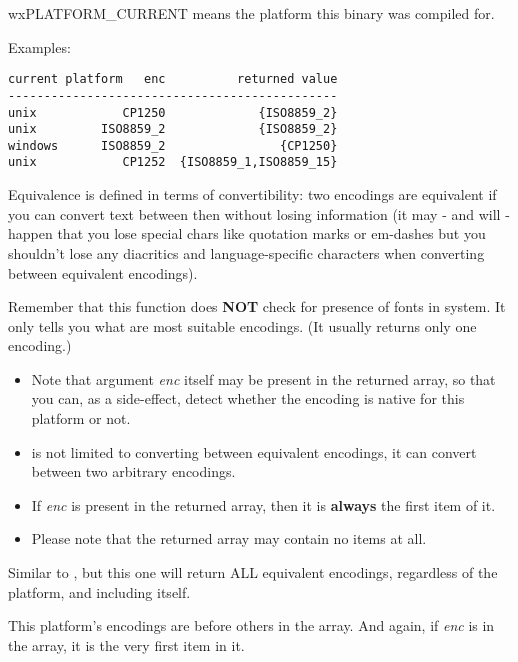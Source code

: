 wxPLATFORM\_CURRENT means the platform this binary was compiled for.

Examples:

\begin{verbatim}
current platform   enc          returned value
----------------------------------------------
unix            CP1250             {ISO8859_2}
unix         ISO8859_2             {ISO8859_2}
windows      ISO8859_2                {CP1250}
unix            CP1252  {ISO8859_1,ISO8859_15}
\end{verbatim}

Equivalence is defined in terms of convertibility:
two encodings are equivalent if you can convert text between
then without losing information (it may - and will - happen
that you lose special chars like quotation marks or em-dashes
but you shouldn't lose any diacritics and language-specific
characters when converting between equivalent encodings).

Remember that this function does {\bf NOT} check for presence of
fonts in system. It only tells you what are most suitable
encodings. (It usually returns only one encoding.)


\begin{itemize}\itemsep=0pt
\item Note that argument {\it enc} itself may be present in the returned array,
so that you can, as a side-effect, detect whether the
encoding is native for this platform or not.
\item {} is not limited to 
converting between equivalent encodings, it can convert between two arbitrary
encodings.
\item If {\it enc} is present in the returned array, then it is {\bf always} the first
item of it.
\item Please note that the returned array may contain no items at all.
\end{itemize}

\label{wxencodingconvertergetallequivalents}


Similar to 
, 
but this one will return ALL 
equivalent encodings, regardless of the platform, and including itself.

This platform's encodings are before others in the array. And again, if {\it enc} is in the array,
it is the very first item in it.

